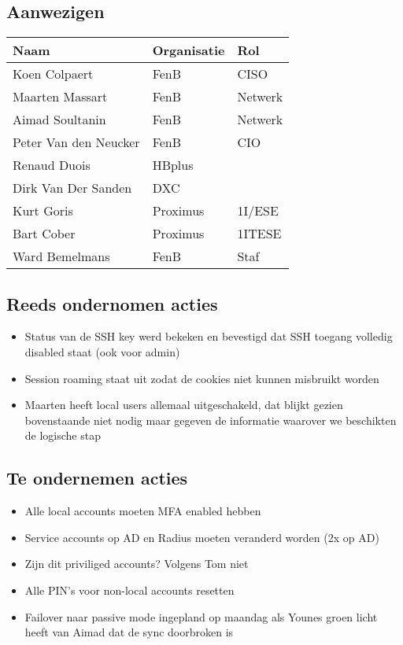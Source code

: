 \documentclass[11pt]{article}
\begin{document}
\subsection{Aanwezigen}
\label{sec:orgc7c0fba}

\begin{center}
\begin{tabular}{lll}
Naam & Organisatie & Rol\\
\hline
Koen Colpaert & FenB & CISO\\
Maarten Massart & FenB & Netwerk\\
Aimad Soultanin & FenB & Netwerk\\
Peter Van den Neucker & FenB & CIO\\
Renaud Duois & HBplus & \\
Dirk Van Der Sanden & DXC & \\
Kurt Goris & Proximus & 1I/ESE\\
Bart Cober & Proximus & 1ITESE\\
Ward Bemelmans & FenB & Staf\\
\end{tabular}
\end{center}

\subsection{Reeds ondernomen acties}
\label{sec:org85a66d0}
\begin{itemize}
\item Status van de SSH key werd bekeken en bevestigd dat SSH toegang volledig disabled staat (ook voor admin)
\item Session roaming staat uit zodat de cookies niet kunnen misbruikt worden
\item Maarten heeft local users allemaal uitgeschakeld, dat blijkt gezien bovenstaande niet nodig maar gegeven de informatie waarover we beschikten de logische stap
\end{itemize}

\subsection{Te ondernemen acties}
\label{sec:org2ea5c8d}
\begin{itemize}
\item Alle local accounts moeten MFA enabled hebben
\item Service accounts op AD en Radius moeten veranderd worden (2x op AD)
\item Zijn dit priviliged accounts? Volgens Tom niet
\item Alle PIN's voor non-local accounts resetten
\item Failover naar passive mode ingepland op maandag als Younes groen licht heeft van Aimad dat de sync doorbroken is
\end{itemize}
\end{document}
